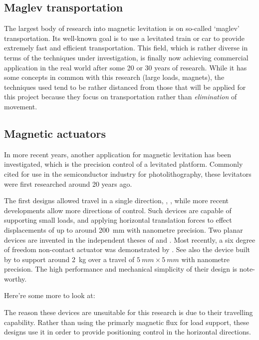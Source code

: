 \subsection{Maglev transportation}

The largest body of research into magnetic levitation is on so-called `maglev'
transportation. Its well-known goal is to use a levitated train or car to
provide extremely fast and efficient transportation. This field, which is
rather diverse in terms of the techniques under investigation, is finally now
achieving commercial application in the real world after some 20 or 30 years
of research. While it has some concepts in common with this research (large
loads, magnets), the techniques used tend to be rather distanced from those
that will be applied for this project because they focus on transportation
rather than \emph{elimination} of movement.

\subsection{Magnetic actuators}

In more recent years, another application for magnetic levitation has been
investigated, which is the precision control of a levitated platform. Commonly
cited for use in the semiconductor industry for photolithography, these
levitators were first researched around 20 years ago.

The first designs allowed travel in a single direction, \eg,
\textcite{trumper1992}, while more recent developments allow more directions
of control. Such devices are capable of supporting small loads, and applying
horizontal translation forces to effect displacements of up to around
\SI{200}{mm} with nanometre precision. Two planar devices are invented in the
independent theses of \textcite{kim1997} and \textcite{molenaar2000}. Most
recently, a six degree of freedom non-contact actuator was demonstrated by
\textcite{verma2004}. See also the device built by \textcite{kim2007} to
support around \SI{2}{kg} over a travel of $\SI{5}{mm}\times\SI{5}{mm}$ with
nanometre precision. The high performance and mechanical simplicity of their
design is note-worthy.

Here're some more to look at: \textcite{boeij2008,zhang2008a}

The reason these devices are unsuitable for this research is due to their
travelling capability. Rather than using the primarly magnetic flux for load
support, these designs use it in order to provide positioning control in the
horizontal directions.

